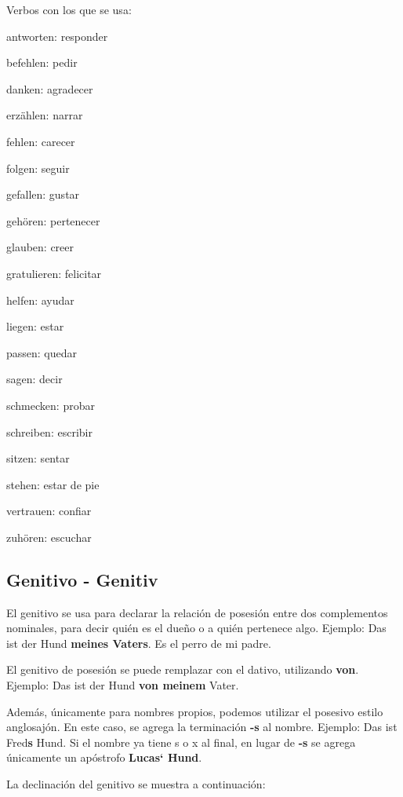 Verbos con los que se usa:
\begin{multicols}{3}
\begin{myitemize}
\item antworten: responder
\item befehlen: pedir
\item danken: agradecer
\item erzählen: narrar
\item fehlen: carecer
\item folgen: seguir
\item gefallen: gustar
\item gehören: pertenecer
\item glauben: creer
\item gratulieren: felicitar
\item helfen: ayudar
\item liegen: estar
\item passen: quedar
\item sagen: decir
\item schmecken: probar
\item schreiben: escribir
\item sitzen: sentar
\item stehen: estar de pie
\item vertrauen: confiar
\item zuhören: escuchar
\end{myitemize}
\end{multicols}

\subsection{Genitivo - Genitiv}
El genitivo se usa para declarar la relación de posesión entre dos complementos nominales, para decir quién es el dueño o a quién pertenece algo. Ejemplo: Das ist der Hund \textbf{meines Vaters}. Es el perro de mi padre.

El genitivo de posesión se puede remplazar con el dativo, utilizando \textbf{von}. Ejemplo: Das ist der Hund \textbf{von meinem} Vater.

Además, únicamente para nombres propios, podemos utilizar el posesivo estilo anglosajón. En este caso, se agrega la terminación \textbf{-s} al nombre. Ejemplo: Das ist Fred\textbf{s} Hund. Si el nombre ya tiene s o x al final, en lugar de \textbf{-s} se agrega únicamente un apóstrofo \textbf{Lucas` Hund}.

La declinación del genitivo se muestra a continuación: 

